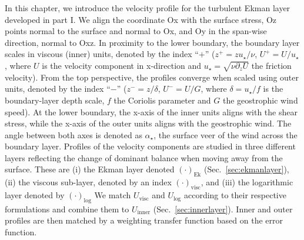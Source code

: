\documentclass[a4paper,11pt]{article}
\newcommand{\p}{\partial}
\newcommand{\RE}{\mathbf{Re}}
\begin{document}
In this chapter, we introduce the velocity profile for the turbulent Ekman layer developed in part I. 
We align the coordinate Ox with the surface stress, Oz points normal to the surface and normal to Ox, and Oy in the span-wise direction, normal to Oxz.
In proximity to the lower boundary, the boundary layer scales in viscous (inner) units, denoted by the index ``$+$'' ($z^+ = zu_\star/\nu$, $U^+=U/u_\star$, where $U$ is the velocity component in x-direction and $u_\star = \sqrt{\nu \p_z U}$ the friction velocity). From the top perspective, the profiles converge when scaled using outer units, denoted by the index ``$-$'' ($z^-=z/\delta$, $U^-=U/G$, where $\delta=u_\star/f$ is the boundary-layer depth scale, $f$ the Coriolis parameter and $G$ the geostrophic wind speed). 
At the lower boundary, the x-axis of the inner units aligns with the shear stress, while the x-axis of the outer units aligns with the geostrophic wind. The angle between both axes is denoted as $\alpha_\star$, the surface veer of the wind across the boundary layer. 
%
Profiles of the velocity components are studied in three different layers reflecting the change of dominant balance when moving away from the surface. These are
(i) the Ekman layer denoted $(\cdot)_\text{Ek}$ (Sec.~\ref{sec:ekmanlayer}), 
(ii) the viscous sub-layer, denoted by an index $(\cdot)_\text{visc}$, 
and (iii) the logarithmic layer denoted by $(\cdot)_\text{log}$
We match $U_\text{visc}$ and $U_\text{log}$ according to their respective formulations and combine them to $U_\text{inner}$ (Sec.~\ref{sec:innerlayer}).
Inner and outer profiles are then matched by a weighting transfer function based on the error function. 

\end{document}

